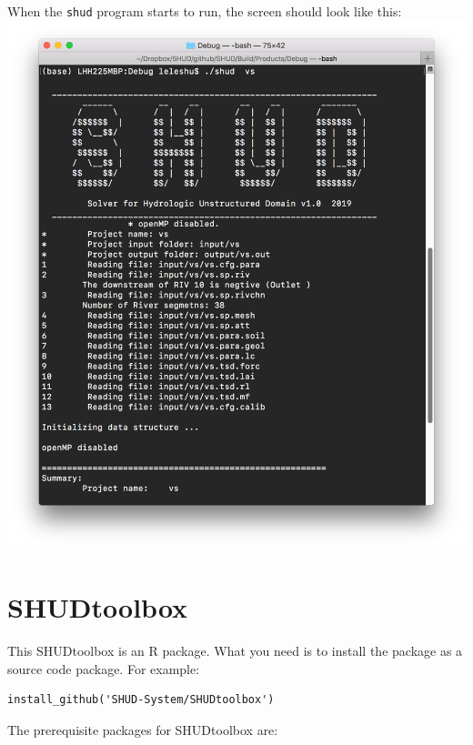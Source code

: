 \documentclass[
]{scrbook}
\begin{document}
When the \texttt{shud} program starts to run, the screen should look like this:
\includegraphics{Fig/CLI_vs.png}

\hypertarget{shudtoolbox}{%
\section{SHUDtoolbox}\label{shudtoolbox}}

This SHUDtoolbox is an R package. What you need is to install the package as a source code package.
For example:

\begin{verbatim}
install_github('SHUD-System/SHUDtoolbox')
\end{verbatim}

The prerequisite packages for SHUDtoolbox are:
\end{document}
